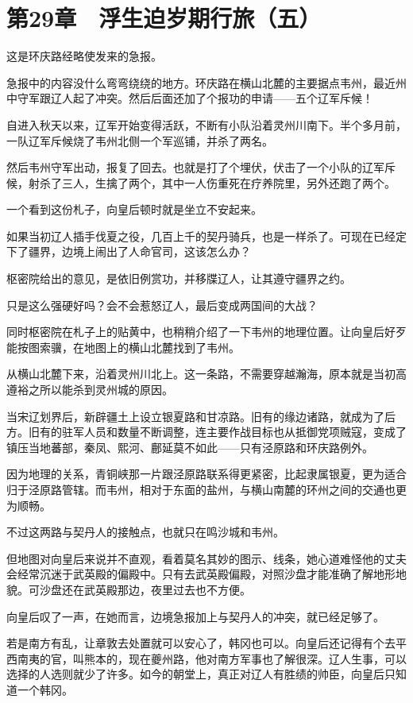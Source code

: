 \section{第29章　浮生迫岁期行旅（五）}

这是环庆路经略使发来的急报。 

急报中的内容没什么弯弯绕绕的地方。环庆路在横山北麓的主要据点韦州，最近州中守军跟辽人起了冲突。然后后面还加了个报功的申请——五个辽军斥候！ 

自进入秋天以来，辽军开始变得活跃，不断有小队沿着灵州川南下。半个多月前，一队辽军斥候烧了韦州北侧一个军巡铺，并杀了两名。 

然后韦州守军出动，报复了回去。也就是打了个埋伏，伏击了一个小队的辽军斥候，射杀了三人，生擒了两个，其中一人伤重死在疗养院里，另外还跑了两个。 

一个看到这份札子，向皇后顿时就是坐立不安起来。 

如果当初辽人插手伐夏之役，几百上千的契丹骑兵，也是一样杀了。可现在已经定下了疆界，边境上闹出了人命官司，这该怎么办？ 

枢密院给出的意见，是依旧例赏功，并移牒辽人，让其遵守疆界之约。 

只是这么强硬好吗？会不会惹怒辽人，最后变成两国间的大战？ 

同时枢密院在札子上的贴黄中，也稍稍介绍了一下韦州的地理位置。让向皇后好歹能按图索骥，在地图上的横山北麓找到了韦州。 

从横山北麓下来，沿着灵州川北上。这一条路，不需要穿越瀚海，原本就是当初高遵裕之所以能杀到灵州城的原因。 

当宋辽划界后，新辟疆土上设立银夏路和甘凉路。旧有的缘边诸路，就成为了后方。旧有的驻军人员和数量不断调整，连主要作战目标也从抵御党项贼寇，变成了镇压当地蕃部，秦凤、熙河、鄜延莫不如此——只有泾原路和环庆路例外。 

因为地理的关系，青铜峡那一片跟泾原路联系得更紧密，比起隶属银夏，更为适合归于泾原路管辖。而韦州，相对于东面的盐州，与横山南麓的环州之间的交通也更为顺畅。 

不过这两路与契丹人的接触点，也就只在鸣沙城和韦州。 

但地图对向皇后来说并不直观，看着莫名其妙的图示、线条，她心道难怪他的丈夫会经常沉迷于武英殿的偏殿中。只有去武英殿偏殿，对照沙盘才能准确了解地形地貌。可沙盘还在武英殿那边，夜里过去也不方便。 

向皇后叹了一声，在她而言，边境急报加上与契丹人的冲突，就已经足够了。 

若是南方有乱，让章敦去处置就可以安心了，韩冈也可以。向皇后还记得有个去平西南夷的官，叫熊本的，现在夔州路，他对南方军事也了解很深。辽人生事，可以选择的人选则就少了许多。如今的朝堂上，真正对辽人有胜绩的帅臣，向皇后只知道一个韩冈。 

